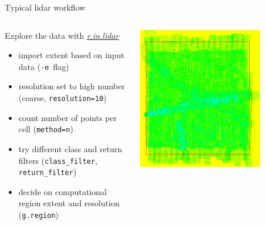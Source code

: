 \documentclass[xcolor={dvipsnames,usenames},beamer,aspectratio=169]{beamer}
\newcommand{\gmodule}[1]{\href{http://grass.osgeo.org/grass71/manuals/#1.html}{\emph{#1}}}
\begin{document}
\begin{frame}{Typical lidar workflow}

\begin{columns}
\begin{column}{0.5\textwidth}

Explore the data with \gmodule{r.in.lidar}
 \begin{itemize}
  \item import extent based on input data (\texttt{-e}~flag)
  \item resolution set to high number (coarse, \texttt{resolution=10})
  \item count number of points per cell (\texttt{method=n})
  \item try different class and return filters (\texttt{class\_filter}, \texttt{return\_filter})
  \item decide on computational region extent and resolution (\texttt{g.region})
 \end{itemize}

\end{column}
\begin{column}{0.45\textwidth}

\begin{center}
  \includegraphics[width=0.75\textwidth]{grass/rinlidar_region}


\end{center}
\end{column}
\end{columns}
\end{frame}
\end{document}
